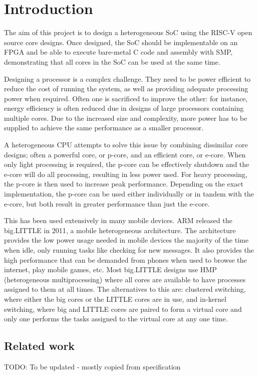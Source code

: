 \section{Introduction}
The aim of this project is to design a heterogeneous SoC using the RISC-V open source core designs. Once designed, the SoC should be implementable on an FPGA and be able to execute bare-metal C code and assembly with SMP, demonstrating that all cores in the SoC can be used at the same time.

Designing a processor is a complex challenge. They need to be power efficient to reduce the cost of running the system, as well as providing adequate processing power when required. Often one is sacrificed to improve the other: for instance, energy efficiency is often reduced due in designs of large processors containing multiple cores. Due to the increased size and complexity, more power has to be supplied to achieve the same performance as a smaller processor.

A heterogeneous CPU attempts to solve this issue by combining dissimilar core designs; often a powerful core, or p-core, and an efficient core, or e-core. When only light processing is required, the p-core can be effectively shutdown and the e-core will do all processing, resulting in less power used. For heavy processing, the p-core is then used to increase peak performance. Depending on the exact implementation, the p-core can be used either individually or in tandem with the e-core, but both result in greater performance than just the e-core.

This has been used extensively in many mobile devices. ARM released the big.LITTLE in 2011\cite{biglittle}, a mobile heterogeneous architecture. The architecture provides the low power usage needed in mobile devices the majority of the time when idle, only running tasks like checking for new messages. It also provides the high performance that can be demanded from phones when used to browse the internet, play mobile games, etc. Most big.LITTLE designs use HMP (heterogeneous multiprocessing) where all cores are available to have processes assigned to them at all times. The alternatives to this are: clustered switching, where either the big cores or the LITTLE cores are in use, and in-kernel switching, where big and LITTLE cores are paired to form a virtual core and only one performs the tasks assigned to the virtual core at any one time.

\subsection{Related work}
TODO: To be updated - mostly copied from specification
